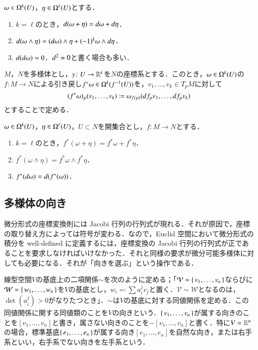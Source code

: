 \begin{prop}[外微分の基本性質] $\omega \in \Omega^k(U)$，$\eta \in \Omega^\ell(U)$とする．
\begin{enumerate}
\item $k=\ell$のとき，$\mathop{}\!d (\omega + \eta) = \mathop{}\!d \omega + \mathop{}\!d \eta$．
\item $\mathop{}\!d (\omega \wedge \eta) = (\mathop{}\!d \omega) \wedge \eta + (-1)^k \omega \wedge \mathop{}\!d \eta$．
\item $\mathop{}\!d (\mathop{}\!d \omega) = 0$．$\mathop{}\!d^2 = 0$と書く場合も多い．
\end{enumerate}
\end{prop}

\begin{defi}$M$，$N$を多様体とし，$y \colon U \to \mathbb{R}^k$を$N$の座標系とする．このとき，$\omega \in \Omega^k(U)$の$f \colon M \to N$による引き戻し$f^* \omega \in \Omega^k(f^{-1}(U))$を，$v_1, \dots, v_k \in T_pM$に対して
\begin{equation}
(f^* \omega)_p (v_1, \dots, v_k) \coloneqq \omega_{f(p)} (\mathop{}\!d f_p v_1, \dots, \mathop{}\!d f_p v_k)
\end{equation}とすることで定める．
\end{defi}

\begin{prop}[引き戻しの基本性質] $\omega \in \Omega^k(U)$，$\eta \in \Omega^\ell(U)$，$U \subset N$を開集合とし，$f \colon M \to N$とする．
\begin{enumerate}
\item $k = \ell$のとき，$f^*(\omega + \eta) = f^* \omega + f^* \eta$．
\item $f^*(\omega \wedge \eta) = f^* \omega \wedge f^* \eta$．
\item $f^*(\mathop{}\!d \omega) = \mathop{}\!d (f^*(\omega))$．
\end{enumerate}
\end{prop}

\subsection{多様体の向き}

微分形式の座標変換則には Jacobi 行列の行列式が現れる．それが原因で，座標の取り替え方によっては符号が変わる．なので，Euclid 空間において微分形式の積分を well-defined に定義するには，座標変換の Jacobi 行列の行列式が正であることを要求しなければいけなかった．それと同様の要求が微分可能多様体に対しても必要になる．それが「向きを選ぶ」という操作である．

\begin{defi}
線型空間$V$の基底上の二項関係$\sim$を次のように定める；「$\mathcal{V} = \set{v_1, \dots, v_n}$ならびに$\mathcal{W} = \set{w_1, \dots, w_n}$を$V$の基底とし，$w_i \eqqcolon \sum a_i^j v_j$と置く．$\mathcal{V} \sim \mathcal{W}$となるのは，$\det \left(a_i^j\right) > 0$がなりたつとき」．$\sim$は$V$の基底に対する同値関係を定める．この同値関係に関する同値類のことを$V$の向きという．$\set{v_1, \dots, v_n}$が属する向きのことを$[ v_1, \dots, v_n ]$と書き，属さない向きのことを$- [ v_1, \dots, v_n ]$と書く．特に$V=\mathbb{R}^n$の場合，標準基底$\set{e_1, \dots, e_n}$が属する向き$[e_1, \dots, e_n]$を自然な向き，または右手系といい，右手系でない向きを左手系という．
\end{defi}

